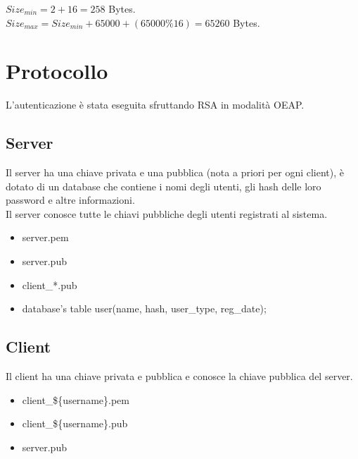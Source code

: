 \documentclass[a4paper,titlepage]{article}
\begin{document}
$Size_{min} = 2 + 16 = 258$ Bytes.\\
$Size_{max} = Size_{min} + 65000 + ( 65000 \% 16 ) = 65260 $ Bytes.\\

\section{Protocollo}
L'autenticazione è stata eseguita sfruttando RSA in modalità OEAP.
\subsection{Server}
Il server ha una chiave privata e una pubblica (nota a priori per ogni client), è dotato di un database che contiene i nomi degli utenti, gli hash delle loro password e altre informazioni.\\
Il server conosce tutte le chiavi pubbliche degli utenti registrati al sistema.
\begin{itemize}
\item server.pem
\item server.pub
\item client\_*.pub
\item database's table user(name, hash, user\_type, reg\_date);
\end{itemize}

\subsection{Client}
Il client ha una chiave privata e pubblica e conosce la chiave pubblica del server.
\begin{itemize}
\item client\_\$\{username\}.pem
\item client\_\$\{username\}.pub
\item server.pub
\end{itemize}
\end{document}
